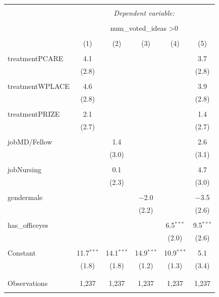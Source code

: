 \documentclass[12pt, titlepage]{article}
\begin{document}
\begin{table}
\centering

\begin{tabular}{@{\extracolsep{5pt}}lccccc} 
\\[-1.8ex]\hline 
\hline \\[-1.8ex] 
 & \multicolumn{5}{c}{\textit{Dependent variable:}} \\ 
\cline{2-6} 
\\[-1.8ex] & \multicolumn{5}{c}{num\_voted\_ideas \textgreater  0} \\ 
\\[-1.8ex] & (1) & (2) & (3) & (4) & (5)\\ 
\hline \\[-1.8ex] 
 treatmentPCARE & 4.1 &  &  &  & 3.7 \\ 
  & (2.8) &  &  &  & (2.8) \\ 
  & & & & & \\ 
 treatmentWPLACE & 4.6 &  &  &  & 3.9 \\ 
  & (2.8) &  &  &  & (2.8) \\ 
  & & & & & \\ 
 treatmentPRIZE & 2.1 &  &  &  & 1.4 \\ 
  & (2.7) &  &  &  & (2.7) \\ 
  & & & & & \\ 
 jobMD/Fellow &  & 1.4 &  &  & 2.6 \\ 
  &  & (3.0) &  &  & (3.1) \\ 
  & & & & & \\ 
 jobNursing &  & 0.1 &  &  & 4.7 \\ 
  &  & (2.3) &  &  & (3.0) \\ 
  & & & & & \\ 
 gendermale &  &  & $-$2.0 &  & $-$3.5 \\ 
  &  &  & (2.2) &  & (2.6) \\ 
  & & & & & \\ 
 has\_officeyes &  &  &  & 6.5$^{***}$ & 9.5$^{***}$ \\ 
  &  &  &  & (2.0) & (2.6) \\ 
  & & & & & \\ 
 Constant & 11.7$^{***}$ & 14.1$^{***}$ & 14.9$^{***}$ & 10.9$^{***}$ & 5.1 \\ 
  & (1.8) & (1.8) & (1.2) & (1.3) & (3.4) \\ 
  & & & & & \\ 
\hline \\[-1.8ex] 
Observations & 1,237 & 1,237 & 1,237 & 1,237 & 1,237 \\ 
\hline 
\hline \\[-1.8ex] 
\end{tabular} 
\end{table}
\end{document}
